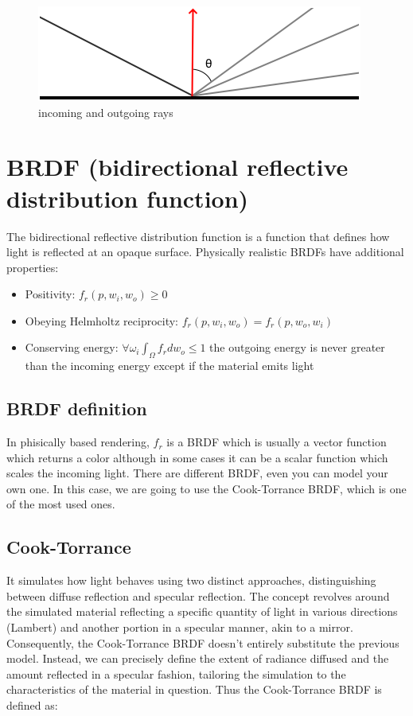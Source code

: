 \documentclass{article}
\begin{document}
\begin{figure}[h]
\centering
\includegraphics[scale=0.35]{rays.png}
\caption{incoming and outgoing rays}
\label{fig:incoming and outgoing rays}
\end{figure}

\section{BRDF (bidirectional reflective distribution function)}

The bidirectional reflective distribution function is a function that defines how light is reflected at an opaque surface. Physically realistic BRDFs have additional properties:

\begin{itemize}
  \item Positivity: $f_{r}\left (  p, w_{i}, w_{o} \right ) \geq 0$
  \item Obeying Helmholtz reciprocity: $f_{r}\left (  p, w_{i}, w_{o} \right ) = f_{r}\left (  p, w_{o}, w_{i} \right )$
  \item Conserving energy: $\forall \omega_{i} \int_{\Omega}f_{r}dw_{o} \leq 1$ the outgoing energy is never greater than the incoming energy except if the material emits light
\end{itemize}

\subsection{BRDF definition}
In phisically based rendering, $f_{r}$ is a BRDF which is usually a vector function which returns a color although in some cases it can be a scalar function which scales the incoming light. There are different BRDF, even you can model your own one. In this case, we are going to use the Cook-Torrance BRDF, which is one of the most used ones.

\subsection{Cook-Torrance}

It simulates how light behaves using two distinct approaches, distinguishing between diffuse reflection and specular reflection. The concept revolves around the simulated material reflecting a specific quantity of light in various directions (Lambert) and another portion in a specular manner, akin to a mirror. Consequently, the Cook-Torrance BRDF doesn't entirely substitute the previous model. Instead, we can precisely define the extent of radiance diffused and the amount reflected in a specular fashion, tailoring the simulation to the characteristics of the material in question. Thus the Cook-Torrance BRDF is defined as:
\end{document}
